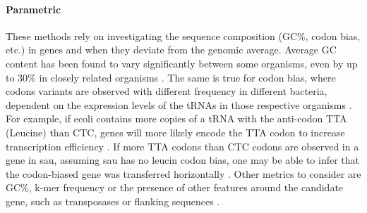 \paragraph{Parametric}
These methods rely on investigating the sequence composition (GC\%, codon bias, etc.) in genes and when they deviate from the genomic average.
Average GC content has been found to vary significantly between some organisms, even by up to $30\%$ in closely related organisms \citep{ihgt}.
The same is true for codon bias, where codons variants are observed with different frequency in different bacteria, dependent on the expression levels of the tRNAs in those respective organisms \citep{ihgt,codonbias}.
For example, if \ac{ecoli} contains more copies of a tRNA with the anti-codon TTA (Leucine) than CTC, genes will more likely encode the TTA codon to increase transcription efficiency \citep{codonbias}.
If more TTA codons than CTC codons are observed in a gene in \ac{sau}, assuming \ac{sau} has no leucin codon bias, one may be able to infer that the codon-biased gene was transferred horizontally \citep{ihgt}.
Other metrics to consider are GC\%, k-mer frequency or the presence of other features around the candidate gene, such as transposases or flanking sequences \citep{ihgt}.
